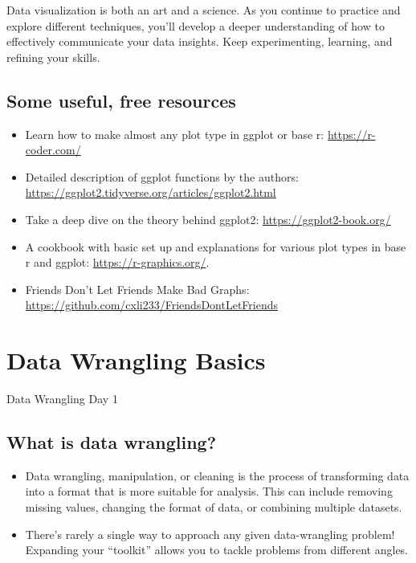 \documentclass[
  letterpaper,
  DIV=11,
  numbers=noendperiod]{scrreprt}
\providecommand{\tightlist}{%
  \setlength{\itemsep}{0pt}\setlength{\parskip}{0pt}}\usepackage{longtable,booktabs,array}
\begin{document}
Data visualization is both an art and a science. As you continue to
practice and explore different techniques, you'll develop a deeper
understanding of how to effectively communicate your data insights. Keep
experimenting, learning, and refining your skills.

\section{Some useful, free resources}\label{some-useful-free-resources}

\begin{itemize}
\tightlist
\item
  Learn how to make almost any plot type in ggplot or base r:
  \url{https://r-coder.com/}
\item
  Detailed description of ggplot functions by the authors:
  \url{https://ggplot2.tidyverse.org/articles/ggplot2.html}
\item
  Take a deep dive on the theory behind ggplot2:
  \url{https://ggplot2-book.org/}
\item
  A cookbook with basic set up and explanations for various plot types
  in base r and ggplot: \url{https://r-graphics.org/}.
\item
  Friends Don't Let Friends Make Bad Graphs:
  \url{https://github.com/cxli233/FriendsDontLetFriends}
\end{itemize}


\chapter{Data Wrangling Basics}\label{data-wrangling-basics}

Data Wrangling Day 1

\hfill\break

\section{What is data wrangling?}\label{what-is-data-wrangling}

\begin{itemize}
\item
  Data wrangling, manipulation, or cleaning is the process of
  transforming data into a format that is more suitable for analysis.
  This can include removing missing values, changing the format of data,
  or combining multiple datasets.
\item
  There's rarely a single way to approach any given data-wrangling
  problem! Expanding your ``toolkit'' allows you to tackle problems from
  different angles.
\end{itemize}
\end{document}
